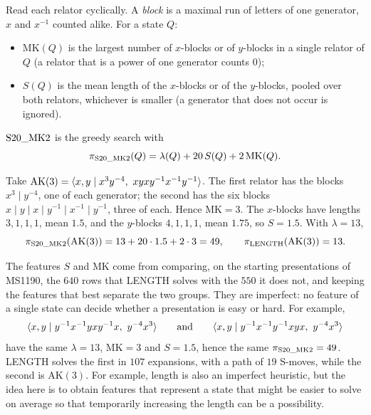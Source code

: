 \begin{definition}[$\SMK$]\label{def:smk}
Read each relator cyclically. A \emph{block} is a maximal run of letters of one generator, $x$ and $x^{-1}$ counted
alike. For a state $Q$:
\begin{itemize}
  \item $\mathrm{MK}(Q)$ is the largest number of $x$-blocks or of $y$-blocks in a single relator of $Q$ (a relator
  that is a power of one generator counts $0$);
  \item $S(Q)$ is the mean length of the $x$-blocks or of the $y$-blocks, pooled over both relators, whichever is
  smaller (a generator that does not occur is ignored).
\end{itemize}
$\SMK$ is the greedy search with
\[
\pi_{\mathrm{S20\_MK2}}(Q)=\lambda(Q)+20\,S(Q)+2\,\mathrm{MK}(Q).
\]
\end{definition}

\begin{example}
Take $\mathrm{AK}(3)=\pres{x,y}{x^3y^{-4},\ xyxy^{-1}x^{-1}y^{-1}}$. The first relator has the blocks
$x^3\mid y^{-4}$, one of each generator; the second has the six blocks $x\mid y\mid x\mid y^{-1}\mid x^{-1}\mid y^{-1}$,
three of each. Hence $\mathrm{MK}=3$. The $x$-blocks have lengths $3,1,1,1$, mean $1.5$, and the $y$-blocks
$4,1,1,1$, mean $1.75$, so $S=1.5$. With $\lambda=13$,
\[
\pi_{\mathrm{S20\_MK2}}(\mathrm{AK}(3))=13+20\cdot1.5+2\cdot3=49,\qquad \pi_{\mathrm{LENGTH}}(\mathrm{AK}(3))=13.
\]
\end{example}

\begin{remark}
The features $S$ and $\mathrm{MK}$ come from comparing, on the starting presentations of MS1190, the $640$ rows that
LENGTH solves with the $550$ it does not, and keeping the features that best separate the two groups. They are
imperfect: no feature of a single state can decide whether a presentation is easy or hard. For example,
\[
\langle x,y \mid y^{-1}x^{-1}yxy^{-1}x,\ y^{-4}x^3 \rangle
\qquad\text{and}\qquad
\langle x,y \mid y^{-1}x^{-1}y^{-1}xyx,\ y^{-4}x^3 \rangle
\]
have the same $\lambda=13$, $\mathrm{MK}=3$ and $S=1.5$, hence the same $\pi_{\mathrm{S20\_MK2}}=49$. LENGTH solves the first in
$107$ expansions, with a path of $19$ S-moves, while the second is $\mathrm{AK}(3)$. For example, length is also an imperfect heuristic, but the idea here is to obtain features that represent a state that might be easier to solve on average so that temporarily increasing the length can be a possibility.
\end{remark}

